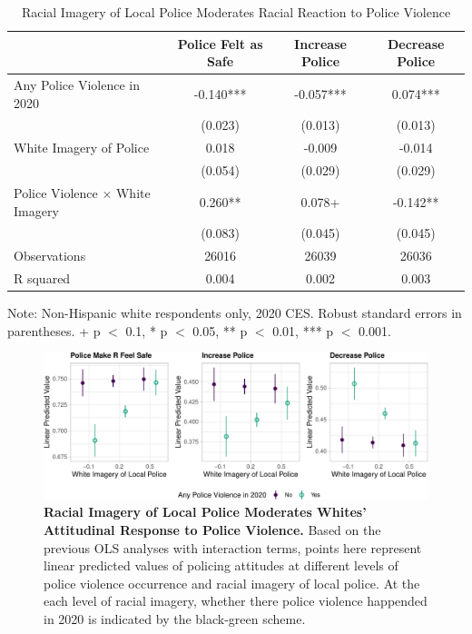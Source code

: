 \documentclass[
  12pt,
]{article}
\begin{document}
\hypertarget{tbl-reaction}{}
\begin{table}
\caption{\label{tbl-reaction}Racial Imagery of Local Police Moderates Racial Reaction to Police
Violence }\tabularnewline

\centering
\begin{threeparttable}
\begin{tabular}[t]{lccc}
\toprule
  & Police Felt as Safe & Increase Police & Decrease Police\\
\midrule
Any Police Violence in 2020 & -0.140*** & -0.057*** & 0.074***\\
 & (0.023) & (0.013) & (0.013)\\
White Imagery of Police & 0.018 & -0.009 & -0.014\\
 & (0.054) & (0.029) & (0.029)\\
Police Violence × White Imagery & 0.260** & 0.078+ & -0.142**\\
 & (0.083) & (0.045) & (0.045)\\
\midrule
Observations & 26016 & 26039 & 26036\\
R squared & 0.004 & 0.002 & 0.003\\
\bottomrule
\end{tabular}
\begin{tablenotes}
\item Note: Non-Hispanic white respondents only, 2020 CES. Robust standard errors in parentheses. + p $<$ 0.1, * p $<$ 0.05, ** p $<$ 0.01, *** p $<$ 0.001.
\end{tablenotes}
\end{threeparttable}
\end{table}

\begin{figure}[tb]

{\centering \includegraphics{racialized-police_files/figure-pdf/fig-reaction-mod-1.pdf}

}

\caption{\label{fig-reaction-mod}\textbf{Racial Imagery of Local Police
Moderates Whites' Attitudinal Response to Police Violence.} Based on the
previous OLS analyses with interaction terms, points here represent
linear predicted values of policing attitudes at different levels of
police violence occurrence and racial imagery of local police. At the
each level of racial imagery, whether there police violence happended in
2020 is indicated by the black-green scheme.}

\end{figure}
\end{document}
